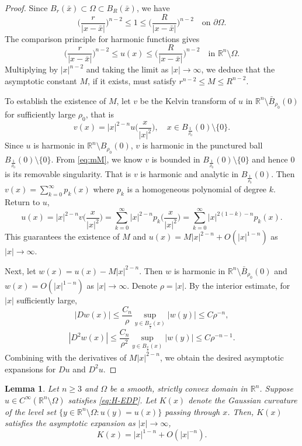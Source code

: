 \documentclass[reqno]{amsart}
\newtheorem{lemma}[theorem]{Lemma}
\theoremstyle{remark}
\theoremstyle{definition}
\numberwithin{equation}{section}
\begin{document}
\begin{proof} 
	Since $B_r(\bar{x})\subset\Omega\subset B_R(\bar{x})$, we have 
	$$\bigg(\frac{r}{|x-\bar{x}|}\bigg)^{n-2}\leq 1\leq \bigg(\frac{R}{|x-\bar{x}|}\bigg)^{n-2}\quad\text{on }\partial\Omega.$$
	The comparison principle for harmonic functions gives 
	\begin{equation}\label{eq:mM}
		\bigg(\frac{r}{|x-\bar{x}|}\bigg)^{n-2}\leq u(x)\leq \bigg(\frac{R}{|x-\bar{x}|}\bigg)^{n-2}\quad\text{in }\mathbb{R}^n\setminus\Omega.
	\end{equation}
	Multiplying by $|x|^{n-2}$ and taking the limit as $|x| \to \infty$, we deduce that the asymptotic constant $M$, if it exists, must satisfy $r^{n-2} \le M \le R^{n-2}$.
	
	To establish the existence of $M$, let $v$ be the Kelvin transform of $u$ in $\mathbb{R}^n\setminus \bar{B}_{\rho_0}(0)$ for sufficiently large $\rho_0$, that is
\[ v(x) = |x|^{2-n} u\bigg(\frac{x}{|x|^2}\bigg), \quad x\in B_{\frac{1}{\rho_0}}(0)\setminus\{0\}.\]
Since \( u \) is harmonic in $\mathbb{R}^n\setminus B_{\rho_0}(0)$, \( v \) is harmonic in the punctured ball $B_{\frac{1}{\rho_0}}(0)\setminus\{0\}$. From \eqref{eq:mM}, we know $v$ is bounded in $B_{\frac{1}{\rho_0}}(0)\setminus\{0\}$ and hence $0$ is its removable singularity. That is $v$ is harmonic and analytic in $B_{\frac{1}{\rho_0}}(0)$. Then \( v(x) = \sum_{k=0}^\infty p_k(x) \) where \( p_k \) is a homogeneous polynomial of degree \( k \). Return to \( u \),
\[ u(x) = |x|^{2-n} v\bigg(\frac{x}{|x|^2}\bigg) = \sum_{k=0}^\infty |x|^{2-n} p_k\bigg(\frac{x}{|x|^2}\bigg) = \sum_{k=0}^\infty |x|^{2(1-k)-n} p_k(x). \] 
This guarantees the existence of $M$ and $u(x) = M|x|^{2-n} + O(|x|^{1-n})$ as $|x| \to \infty$. 

Next, let $w(x)=u(x)-M|x|^{2-n}$. Then $w$ is harmonic in $\mathbb{R}^n\setminus\bar{B}_{\rho_0}(0)$ and $w(x)=O(|x|^{1-n})$ as $|x|\to\infty$. Denote $\rho=|x| $. By the interior estimate, for $|x|$ sufficiently large, 
$$|Dw(x)|\leq \frac{C_n}{\rho}\sup_{y\in B_{\frac{\rho}{2}}(x)}|w(y)|\leq C\rho^{-n},$$
$$|D^2w(x)|\leq\frac{C_n}{\rho^2}\sup_{y\in B_{\frac{\rho}{2}}(x)}|w(y)|\leq C\rho^{-n-1}.$$
Combining with the derivatives of $M|x|^{2-n}$, we obtain the desired asymptotic expansions for $Du$ and $D^2u$. 
\end{proof}

\begin{lemma}\label{lem:K-asy}
	Let $n\geq3$ and $\Omega$ be a smooth, strictly convex domain in $\mathbb{R}^n$. Suppose $u \in C^\infty(\mathbb{R}^n\setminus\Omega)$ satisfies \eqref{eq:H-EDP}. Let $K(x)$ denote the Gaussian curvature of the level set $\{y \in \mathbb{R}^n\setminus\Omega: u(y) = u(x)\}$ passing through $x$. Then, $K(x)$ satisfies the asymptotic expansion as $|x|\to\infty$,
$$K(x) = |x|^{1-n} + O(|x|^{-n}).$$  
\end{lemma}
\end{document}
